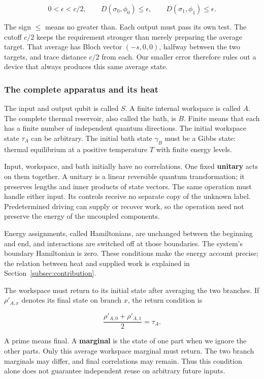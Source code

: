 \documentclass[11pt,letterpaper]{article}
\begin{document}
\[0 < \epsilon < c/2,\quad\quad D\left( \sigma_{0},\phi_{0} \right) \leq \epsilon,\quad\quad D\left( \sigma_{1},\phi_{1} \right) \leq \epsilon.\]

The sign \(\leq\) means no greater than. Each output must pass its own test. The cutoff \(c/2\) keeps the requirement stronger than merely preparing the average target. That average has Bloch vector \(( - s,0,0)\), halfway between the two targets, and trace distance \(c/2\) from each. Our smaller error therefore rules out a device that always produces this same average state.

\subsubsection{The complete apparatus and its heat}\label{the-complete-apparatus-and-its-heat}

The input and output qubit is called \(S\). A finite internal workspace is called \(A\). The complete thermal reservoir, also called the bath, is \(B\). Finite means that each has a finite number of independent quantum directions. The initial workspace state \(\tau_{A}\) can be arbitrary. The initial bath state \(\gamma_{B}\) must be a Gibbs state: thermal equilibrium at a positive temperature \(T\) with finite energy levels.

Input, workspace, and bath initially have no correlations. One fixed \textbf{unitary} acts on them together. A unitary is a linear reversible quantum transformation; it preserves lengths and inner products of state vectors. The same operation must handle either input. Its controls receive no separate copy of the unknown label. Predetermined driving can supply or recover work, so the operation need not preserve the energy of the uncoupled components.

Energy assignments, called Hamiltonians, are unchanged between the beginning and end, and interactions are switched off at those boundaries. The system's boundary Hamiltonian is zero. These conditions make the energy account precise; the relation between heat and supplied work is explained in Section~\ref{subsec:contribution}.

The workspace must return to its initial state after averaging the two branches. If \(\rho\prime_{A,x}\) denotes its final state on branch \(x\), the return condition is

\[\frac{\rho\prime_{A,0} + \rho\prime_{A,1}}{2} = \tau_{A}.\]

A prime means final. A \textbf{marginal} is the state of one part when we ignore the other parts. Only this average workspace marginal must return. The two branch marginals may differ, and final correlations may remain. Thus this condition alone does not guarantee independent reuse on arbitrary future inputs.
\end{document}
